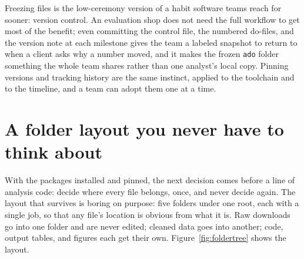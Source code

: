 Freezing files is the low-ceremony version of a habit software teams reach for sooner: version control. An evaluation shop does not need the full workflow to get most of the benefit; even committing the control file, the numbered do-files, and the version note at each milestone gives the team a labeled snapshot to return to when a client asks why a number moved, and it makes the frozen \texttt{ado} folder something the whole team shares rather than one analyst's local copy. Pinning versions and tracking history are the same instinct, applied to the toolchain and to the timeline, and a team can adopt them one at a time.

\section{A folder layout you never have to think about}\label{sec:folders}
With the packages installed and pinned, the next decision comes before a line of analysis code: decide where every file belongs, once, and never decide again. The layout that survives is boring on purpose: five folders under one root, each with a single job, so that any file's location is obvious from what it is. Raw downloads go into one folder and are never edited; cleaned data goes into another; code, output tables, and figures each get their own. Figure~\ref{fig:foldertree} shows the layout.


